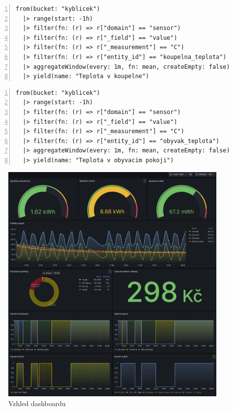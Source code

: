 \begin{lstlisting}[language=flux, breaklines=true, numbers=left, numberstyle=\small, numbersep=10pt, frame=single, basicstyle=\ttfamily\small, caption={Grafana - Průběh teploty - Query C}, label={lst:grafanaTeplota}]
from(bucket: "kyblicek")
  |> range(start: -1h)
  |> filter(fn: (r) => r["domain"] == "sensor")
  |> filter(fn: (r) => r["_field"] == "value")
  |> filter(fn: (r) => r["_measurement"] == "C")
  |> filter(fn: (r) => r["entity_id"] == "koupelna_teplota")
  |> aggregateWindow(every: 1m, fn: mean, createEmpty: false)
  |> yield(name: "Teplota v koupelne")
\end{lstlisting}
\begin{lstlisting}[language=flux, breaklines=true, numbers=left, numberstyle=\small, numbersep=10pt, frame=single, basicstyle=\ttfamily\small, caption={Grafana - Průběh teploty - Query D}, label={lst:grafanaTeplota}]
from(bucket: "kyblicek")
  |> range(start: -1h)
  |> filter(fn: (r) => r["domain"] == "sensor")
  |> filter(fn: (r) => r["_field"] == "value")
  |> filter(fn: (r) => r["_measurement"] == "C")
  |> filter(fn: (r) => r["entity_id"] == "obyvak_teplota")
  |> aggregateWindow(every: 1m, fn: mean, createEmpty: false)
  |> yield(name: "Teplota v obyvacim pokoji")
\end{lstlisting}
\begin{figure}[!ht]
  \begin{center}
  \includegraphics[scale=0.40]{obrazky/Grafana.png}
  \end{center}
  \caption[Vzhled dashboardu]{Vzhled dashboardu}
  \label{fig:GrafanaDashboard}
\end{figure}